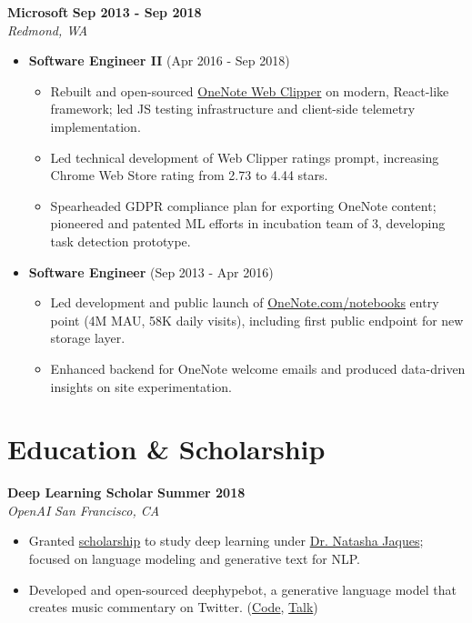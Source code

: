 \documentclass[10pt,letterpaper]{article}
\newcommand{\experienceentry}[5]{
  \noindent\textbf{#1} \hfill \textbf{#2}\\
  \textit{#3} \hfill \textit{#4}\\[-8pt]
  #5
}
\begin{document}
\experienceentry{Microsoft}{Sep 2013 - Sep 2018}{Redmond, WA}{}{
\begin{itemize}
  \item \textbf{Software Engineer II} (Apr 2016 - Sep 2018)
  \begin{itemize}
    \item Rebuilt and open-sourced \href{https://github.com/OneNoteDev/WebClipper}{OneNote Web Clipper} on modern, React-like framework; led JS testing infrastructure and client-side telemetry implementation.
    \item Led technical development of Web Clipper ratings prompt, increasing Chrome Web Store rating from 2.73 to 4.44 stars.
    \item Spearheaded GDPR compliance plan for exporting OneNote content; pioneered and patented ML efforts in incubation team of 3, developing task detection prototype.
  \end{itemize}
  \item \textbf{Software Engineer} (Sep 2013 - Apr 2016)
  \begin{itemize}
    \item Led development and public launch of \href{https://www.onenote.com/notebooks}{OneNote.com/notebooks} entry point (4M MAU, 58K daily visits), including first public endpoint for new storage layer.
    \item Enhanced backend for OneNote welcome emails and produced data-driven insights on site experimentation.
  \end{itemize}
\end{itemize}
}

\section{Education \& Scholarship}
\experienceentry{Deep Learning Scholar}{Summer 2018}{OpenAI}{San Francisco, CA}{
\begin{itemize}
  \item Granted \href{https://blog.openai.com/openai-scholars/}{scholarship} to study deep learning under \href{https://natashajaques.ai/}{Dr. Natasha Jaques}; focused on language modeling and generative text for NLP.
  \item Developed and open-sourced deephypebot, a generative language model that creates music commentary on Twitter. (\href{https://github.com/iconix/deephypebot}{Code}, \href{https://youtu.be/-6Aq5Q0c-CU}{Talk})
\end{itemize}
}
\end{document}
